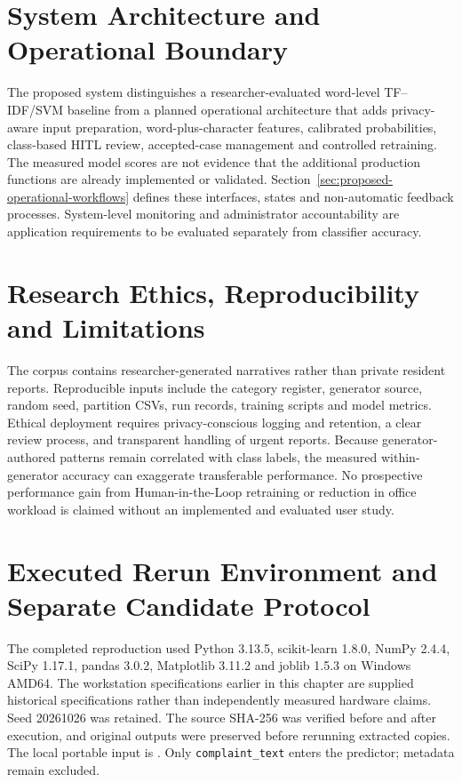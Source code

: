 \section{System Architecture and Operational Boundary}
The proposed system distinguishes a researcher-evaluated word-level TF--IDF/SVM baseline from a planned operational architecture that adds privacy-aware input preparation, word-plus-character features, calibrated probabilities, class-based HITL review, accepted-case management and controlled retraining. The measured model scores are not evidence that the additional production functions are already implemented or validated. Section~\ref{sec:proposed-operational-workflows} defines these interfaces, states and non-automatic feedback processes. System-level monitoring and administrator accountability are application requirements to be evaluated separately from classifier accuracy.



\section{Research Ethics, Reproducibility and Limitations}
The corpus contains researcher-generated narratives rather than private resident reports. Reproducible inputs include the category register, generator source, random seed, partition CSVs, run records, training scripts and model metrics. Ethical deployment requires privacy-conscious logging and retention, a clear review process, and transparent handling of urgent reports. Because generator-authored patterns remain correlated with class labels, the measured within-generator accuracy can exaggerate transferable performance. No prospective performance gain from Human-in-the-Loop retraining or reduction in office workload is claimed without an implemented and evaluated user study.

\section{Executed Rerun Environment and Separate Candidate Protocol}
The completed reproduction used Python 3.13.5, scikit-learn 1.8.0, NumPy 2.4.4, SciPy 1.17.1, pandas 3.0.2, Matplotlib 3.11.2 and joblib 1.5.3 on Windows AMD64. The workstation specifications earlier in this chapter are supplied historical specifications rather than independently measured hardware claims. Seed 20261026 was retained. The source SHA-256 was verified before and after execution, and original outputs were preserved before rerunning extracted copies. The local portable input is . Only \texttt{complaint\_text} enters the predictor; metadata remain excluded.


